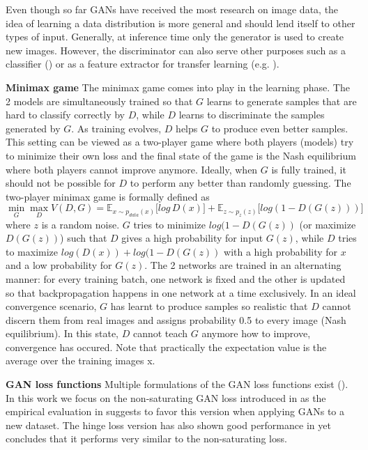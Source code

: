 \documentclass[a4paper,12pt]{report}
\begin{document}
Even though so far GANs have received the most research on image data, the idea of learning a data distribution is more general and should lend itself to other types of input. Generally, at inference time only the generator is used to create new images. However, the discriminator can also serve other purposes such as a classifier (\cite{ImprTechn4TrainGANs}) or as a feature extractor for transfer learning (e.g. \cite{SpotArtifacts}).


\par \textbf{Minimax game} The minimax game comes into play in the learning phase. The 2 models are simultaneously trained so that $G$ learns to generate samples that are hard to classify correctly by $D$, while $D$ learns to discriminate the samples generated by $G$. As training evolves, $D$ helps $G$ to produce even better samples. This setting can be viewed as a two-player game where both players (models) try to minimize their own loss and the final state of the game is the Nash equilibrium where both players cannot improve anymore. Ideally, when $G$ is fully trained, it should not be possible for $D$ to perform any better than randomly guessing. The two-player minimax game is formally defined as
\begin{equation} \label{eq:1}
\min\limits_{G} \max\limits_{D} V(D,G) = \mathbb{E}_{x\sim p_{data} (x)}\big[log\, D(x)\big] + \mathbb{E}_{z\sim p_{z} (z)}\big[log(1 - D(G(z)))\big]
\end{equation}
where $z$ is a random noise. $G$ tries to minimize $log(1 - D(G(z))$ (or maximize $D(G(z))$) such that $D$ gives a high probability for input $G(z)$, while $D$ tries to maximize $log(D(x)) + log(1 - D(G(z))$ with a high probability for $x$ and a low probability for $G(z)$. The 2 networks are trained in an alternating manner: for every training batch, one network is fixed and the other is updated so that backpropagation happens in one network at a time exclusively. In an ideal convergence scenario, $G$ has learnt to produce samples so realistic that $D$ cannot discern them from real images and assigns probability 0.5 to every image (Nash equilibrium). In this state, $D$ cannot teach $G$ anymore how to improve, convergence has occured. Note that practically the expectation value is the average over the training images x.

\par \textbf{GAN loss functions} 
Multiple formulations of the GAN loss functions exist (\cite{GANLandscape}). In this work we focus on the non-saturating GAN loss introduced in \cite{1406.2661} as the empirical evaluation in \cite{GANLandscape} suggests to favor this version when applying GANs to a new dataset. The hinge loss version has also shown good performance in \cite{SNGAN} yet \cite{GANLandscape} concludes that it performs very similar to the non-saturating loss.
\end{document}
